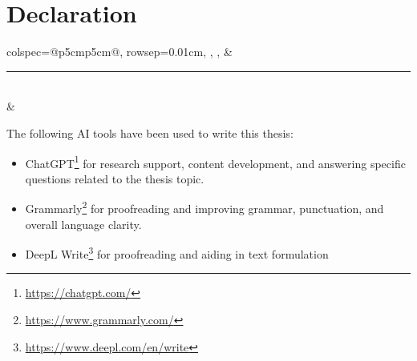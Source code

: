 %
\chapter*{Declaration}
\label{sec:declaration}
\thispagestyle{empty}


\vspace{2cm}

\begin{tblr}{
  colspec={@{}p{5cm}p{5cm}@{}},
  rowsep=0.01cm,
  }
  \thesisUniversityCity, \thesisDate, & \rule{\linewidth}{0.4pt} \\
                                      &  \thesisName
\end{tblr}

\vfill

The following AI tools have been used to write this thesis:
\begin{itemize}
  \item ChatGPT\footnote{\url{https://chatgpt.com/}} for research support, content development, and answering specific questions related to the thesis topic.
  \item Grammarly\footnote{\url{https://www.grammarly.com/}} for proofreading and improving grammar, punctuation, and overall language clarity.
  \item DeepL Write\footnote{\url{https://www.deepl.com/en/write}} for proofreading and aiding in text formulation
\end{itemize}




